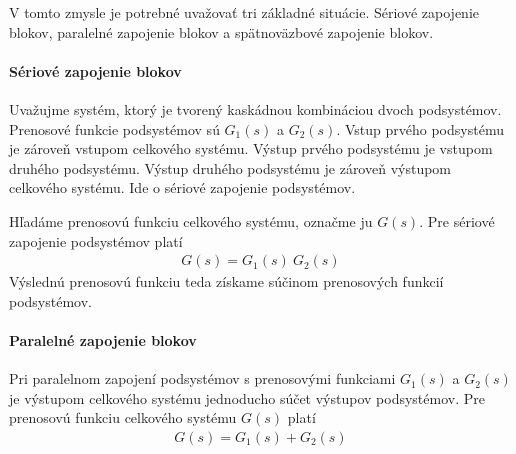 \documentclass[a4paper, 10pt, ]{article}
\begin{document}
V tomto zmysle je potrebné uvažovať tri základné situácie. Sériové zapojenie blokov, paralelné zapojenie blokov a spätnoväzbové zapojenie blokov.



\paragraph{Sériové zapojenie blokov}

Uvažujme systém, ktorý je tvorený kaskádnou kombináciou dvoch podsystémov. Prenosové funkcie podsystémov sú $G_1(s)$ a $G_2(s)$. Vstup prvého podsystému je zároveň vstupom celkového systému. Výstup prvého podsystému je vstupom druhého podsystému. Výstup druhého podsystému je zároveň výstupom celkového systému. Ide o sériové zapojenie podsystémov.

\begin{center}

    \makebox[\textwidth][c]{%
    
    }

	\label{TFalgebra_seriove}

\end{center}

Hľadáme prenosovú funkciu celkového systému, označme ju $G(s)$. Pre sériové zapojenie podsystémov platí
\begin{align}
    G(s) = G_1(s)\ G_2(s)
\end{align}
Výslednú prenosovú funkciu teda získame súčinom prenosových funkcií podsystémov.




\paragraph{Paralelné zapojenie blokov}

\begin{center}

    \makebox[\textwidth][c]{%
    
    }

	\label{TFalgebra_paralelne}

\end{center}

Pri paralelnom zapojení podsystémov s prenosovými funkciami $G_1(s)$ a $G_2(s)$ je výstupom celkového systému jednoducho súčet výstupov podsystémov. Pre prenosovú funkciu celkového systému $G(s)$ platí
\begin{align}
    G(s) = G_1(s) + G_2(s)
\end{align}
\end{document}
